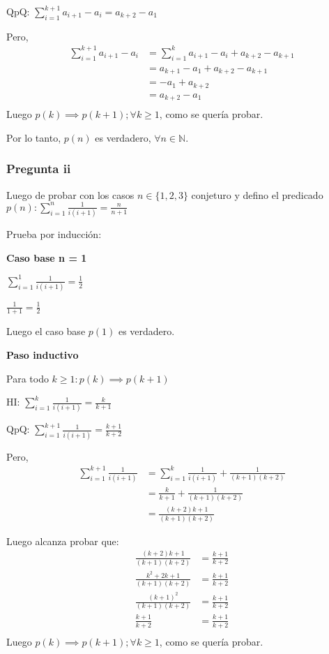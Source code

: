 QpQ: $\sum_{i=1}^{k+1}a_{i+1}-a_i = a_{k+2} - a_1$

Pero,
\begin{align*}
    \sum_{i=1}^{k+1}a_{i+1}-a_i &= \sum_{i=1}^{k}a_{i+1}-a_i + a_{k+2} - a_{k+1} \\
    &= a_{k+1} - a_1 + a_{k+2} - a_{k+1} \\
    &= - a_1 + a_{k+2} \\
    &= a_{k+2} - a_1 \\
\end{align*}
Luego $p(k) \implies p(k+1); \forall k \geq 1$, como se quería probar.

Por lo tanto, $p(n)$ es verdadero, $\forall n \in \mathbb{N}$.

\subsubsection{Pregunta ii}

Luego de probar con los casos $n \in \{ 1,2,3 \}$ conjeturo y defino el predicado $p(n): \sum_{i=1}^{n}\frac{1}{i(i+1)} = \frac{n}{n+1}$

Prueba por inducción:

\textbf{Caso base n = 1}

$\sum_{i=1}^{1}\frac{1}{i(i+1)} = \frac{1}{2}$

$ \frac{1}{1+1} = \frac{1}{2} $

Luego el caso base $p(1)$ es verdadero.

\textbf{Paso inductivo}

Para todo $k \geq 1: p(k) \implies p(k+1)$

HI: $\sum_{i=1}^{k}\frac{1}{i(i+1)} = \frac{k}{k+1}$

QpQ: $\sum_{i=1}^{k+1}\frac{1}{i(i+1)} = \frac{k+1}{k+2}$

Pero,
\begin{align*}
    \sum_{i=1}^{k+1}\frac{1}{i(i+1)} &= \sum_{i=1}^{k}\frac{1}{i(i+1)} + \frac{1}{(k+1)(k+2)} \\
    &= \frac{k}{k+1} + \frac{1}{(k+1)(k+2)} \\
    &= \frac{(k+2)k + 1}{(k+1)(k+2)}
\end{align*}

Luego alcanza probar que:
\begin{align*}
    \frac{(k+2)k + 1}{(k+1)(k+2)} &= \frac{k+1}{k+2} \\
    \frac{k^2 + 2k + 1}{(k+1)(k+2)} &= \frac{k+1}{k+2} \\
    \frac{(k+1)^2}{(k+1)(k+2)} &= \frac{k+1}{k+2} \\
    \frac{k+1}{k+2} &= \frac{k+1}{k+2} \\
\end{align*}
Luego $p(k) \implies p(k+1); \forall k \geq 1$, como se quería probar.


